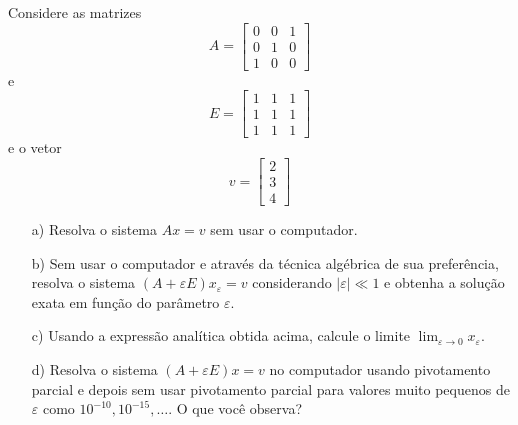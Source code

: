 \begin{exer} Considere as matrizes
  \begin{equation}
    A=
    \begin{bmatrix}
      0&0&1\\
      0&1&0\\
      1&0&0
    \end{bmatrix}
  \end{equation}
e
\begin{equation}
  E=
  \begin{bmatrix}
    1&1&1\\
    1&1&1\\
    1&1&1
  \end{bmatrix}
\end{equation}
e o vetor
\begin{equation}
  v=
  \begin{bmatrix}
    2\\
    3\\
    4
  \end{bmatrix}
\end{equation}
\begin{itemize}
\item[a)] Resolva o sistema $Ax=v$ sem usar o computador.
\item[b)] Sem usar o computador e através da técnica algébrica de sua preferência, resolva o sistema $(A+\varepsilon E)x_\varepsilon=v$ considerando $|\varepsilon|\ll 1$ e obtenha a solução exata em função do parâmetro $\varepsilon$.
\item[c)] Usando a expressão analítica obtida acima, calcule o limite $\lim_{\varepsilon\to 0} x_\varepsilon $.
\item[d)] Resolva o sistema $(A+\varepsilon E)x=v$ no computador usando pivotamento parcial e depois sem usar pivotamento parcial para valores muito pequenos de $\varepsilon$ como $10^{-10}, 10^{-15}, \ldots$. O que você observa?
\end{itemize}
\end{exer}

